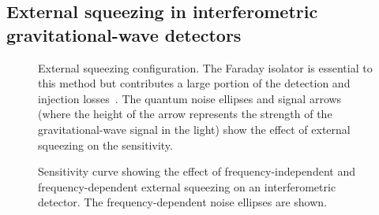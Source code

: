 \subsection{External squeezing in interferometric gravitational-wave detectors}
\label{sec:external_squeezing}

\begin{figure}
	\centering
	\caption{External squeezing configuration. The Faraday isolator is essential to this method but contributes a large portion of the detection and injection losses~\cite{}. The quantum noise ellipses and signal arrows (where the height of the arrow represents the strength of the gravitational-wave signal in the light) show the effect of external squeezing on the sensitivity.}
	\label{fig:extSqz_config}
\end{figure}

\begin{figure}
	\centering
	\caption{Sensitivity curve showing the effect of frequency-independent and frequency-dependent external squeezing on an interferometric detector. The frequency-dependent noise ellipses are shown.}
	\label{fig:extSqz_sensitivity}
\end{figure}


